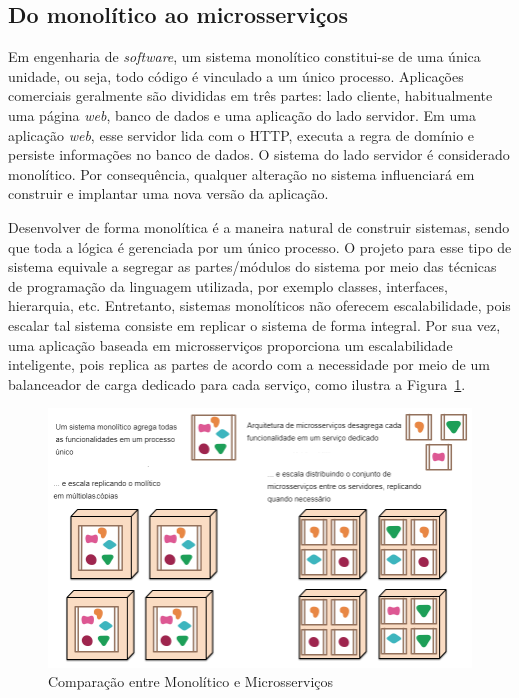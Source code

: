 

\subsection{Do monolítico ao microsserviços}
Em engenharia de \textit{software}, um sistema monolítico constitui-se de uma única unidade, ou seja, todo código é vinculado a um único processo. Aplicações comerciais geralmente são divididas em três partes: lado cliente, habitualmente uma página \textit{web}, banco de dados e uma aplicação do lado servidor. Em uma aplicação \textit{web}, esse servidor lida com o \ac{HTTP}, executa a regra de domínio e persiste informações no banco de dados. O sistema do lado servidor é considerado monolítico. Por consequência, qualquer alteração no sistema influenciará em construir e implantar uma nova versão da aplicação.

Desenvolver de forma monolítica é a maneira natural de construir sistemas, sendo que toda a lógica é gerenciada por um único processo. O projeto para esse tipo de sistema equivale a segregar as partes/módulos do sistema por meio das técnicas de programação da linguagem utilizada, por exemplo classes, interfaces, hierarquia, etc. Entretanto, sistemas monolíticos não oferecem escalabilidade, pois escalar tal sistema consiste em replicar o sistema de forma integral. 
Por sua vez, uma aplicação baseada em microsserviços proporciona um escalabilidade inteligente, pois replica as partes de acordo com a necessidade por meio de um balanceador de carga dedicado para cada serviço, como ilustra a Figura~\ref{monolitico-microsservico}.

\begin{figure}[ht!]
    \caption{\label{monolitico-microsservico}Comparação entre Monolítico e Microsserviços}
    \centering
    \includegraphics[width=0.85\linewidth]{assets/monilitico-microsservico.png}
\end{figure}

